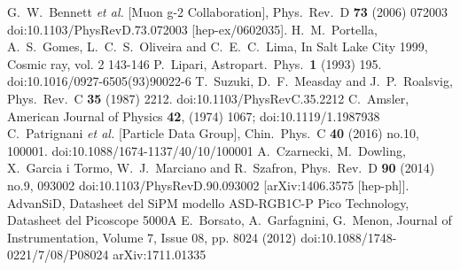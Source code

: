 \begin{thebibliography}{99}
G.~W.~Bennett {\it et al.} [Muon g-2 Collaboration],
Phys.\ Rev.\ D {\bf 73} (2006) 072003
doi:10.1103/PhysRevD.73.072003
[hep-ex/0602035].
H.~M.~Portella, A.~S.~Gomes, L.~C.~S.~Oliveira and C.~E.~C.~Lima,
In Salt Lake City 1999, Cosmic ray, vol. 2 143-146
P.~Lipari,
Astropart.\ Phys.\  {\bf 1} (1993) 195.
doi:10.1016/0927-6505(93)90022-6
T.~Suzuki, D.~F.~Measday and J.~P.~Roalsvig,
Phys.\ Rev.\ C {\bf 35} (1987) 2212.
doi:10.1103/PhysRevC.35.2212
C.~Amsler, 
American Journal of Physics {\bf 42}, (1974) 1067;  
doi:10.1119/1.1987938
C.~Patrignani {\it et al.} [Particle Data Group],
Chin.\ Phys.\ C {\bf 40} (2016) no.10,  100001.
doi:10.1088/1674-1137/40/10/100001
A.~Czarnecki, M.~Dowling, X.~Garcia i Tormo, W.~J.~Marciano and R.~Szafron,
Phys.\ Rev.\ D {\bf 90} (2014) no.9,  093002
doi:10.1103/PhysRevD.90.093002
[arXiv:1406.3575 [hep-ph]].
AdvanSiD,
Datasheet del SiPM modello ASD-RGB1C-P
Pico Technology,
Datasheet del Picoscope 5000A
E.~Borsato, A.~Garfagnini, G.~Menon,
Journal of Instrumentation, Volume 7, Issue 08, pp. 8024 (2012)
doi:10.1088/1748-0221/7/08/P08024
arXiv:1711.01335
\end{thebibliography}
